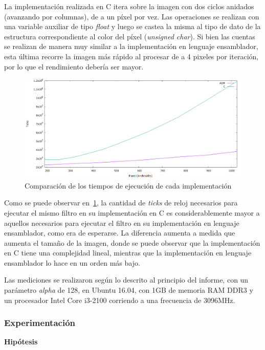 \documentclass[a4paper]{article}
\begin{document}
La implementación realizada en C itera sobre la imagen con dos ciclos anidados (avanzando por columnas), de a un píxel por vez. Las operaciones se realizan con una variable auxiliar de tipo \textit{float} y luego se castea la misma al tipo de dato de la estructura correspondiente al color del píxel (\textit{unsigned char}). Si bien las cuentas se realizan de manera muy similar a la implementación en lenguaje ensamblador, esta última recorre la imagen más rápido al procesar de a 4 pixeles por iteración, por lo que el rendimiento debería ser mayor. 
\\
\begin{figure}[H]
  \begin{center}
	\includegraphics[scale=0.66]{imagenes/combinarC.png}
	\caption{Comparación de los tiempos de ejecución de cada implementación}
	\label{combinar_asmvsc}
  \end{center}
\end{figure}

Como se puede observar en~\ref{combinar_asmvsc}, la cantidad de \textit{ticks} de reloj necesarios para ejecutar el mismo filtro en su implementación en C es considerablemente mayor a aquellos necesarios para ejecutar el filtro en su implementación en lenguaje ensamblador, como era de esperarse. La diferencia aumenta a medida que aumenta el tamaño de la imagen, donde se puede observar que la implementación en C tiene una complejidad lineal, mientras que la implementación en lenguaje ensamblador lo hace en un orden más bajo.

Las mediciones se realizaron según lo descrito al principio del informe, con un parámetro \textit{alpha} de 128, en Ubuntu 16.04, con 1GB de memoria RAM DDR3 y un procesador Intel Core i3-2100 corriendo a una frecuencia de 3096MHz.
\subsubsection{Experimentación}
\textbf{Hipótesis}
\newline
\end{document}
